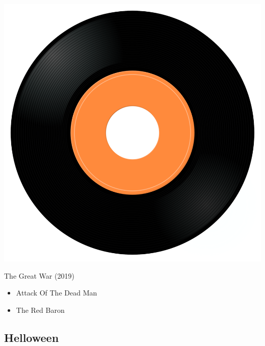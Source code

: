 \begin{minipage}[t]{0.25\textwidth}\vspace{0pt}
\captionsetup{type=figure}
\includegraphics[width=\textwidth]{Images/cover.png}
\caption*{The Great War (2019)}
\end{minipage}
\begin{minipage}[t]{0.25\textwidth}\vspace{0pt}
\begin{itemize}[nosep,leftmargin=1em,labelwidth=*,align=left]
	\setlength{\itemsep}{0pt}
	\item Attack Of The Dead Man
	\item The Red Baron
\end{itemize}
\end{minipage}



\subsection{Helloween}

